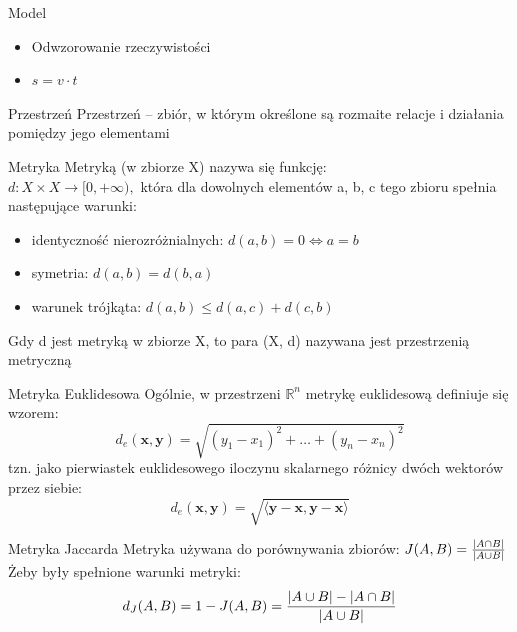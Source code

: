 \documentclass[a4paper]{beamer}
\begin{document}
\begin{frame}
\begin{block}{Model}
\begin{itemize}
\item Odwzorowanie rzeczywistości
\item $s = v \cdot t$
\end{itemize}
\end{block}
\begin{block}{Przestrzeń}
Przestrzeń – zbiór, w którym określone są rozmaite relacje i działania pomiędzy jego elementami
\end{block}
\begin{block}{Metryka}
Metryką (w zbiorze X) nazywa się funkcję: \\
$d: X \times X \to [0, +\infty),$
która dla dowolnych elementów a, b, c tego zbioru spełnia następujące warunki:
\begin{itemize}
\item identyczność nierozróżnialnych: $d(a, b) = 0 \iff a = b$
\item symetria: $d(a, b) = d(b, a)$
\item warunek trójkąta: $d(a, b) \leqslant d(a, c) + d(c, b)$
\end{itemize}
Gdy d jest metryką w zbiorze X, to para (X, d) nazywana jest przestrzenią metryczną
\end{block}
\end{frame}
\begin{frame}
\begin{block}{Metryka Euklidesowa}
Ogólnie, w przestrzeni $\mathbb R^n$ metrykę euklidesową definiuje się wzorem:
$$d_e(\mathbf x, \mathbf y) = \sqrt{(y_1 - x_1)^2 + \dots + (y_n - x_n)^2}$$
tzn. jako pierwiastek euklidesowego iloczynu skalarnego różnicy dwóch wektorów przez siebie:
$$d_e(\mathbf x, \mathbf y) = \sqrt{\langle \mathbf y - \mathbf x, \mathbf y - \mathbf x \rangle}$$
\end{block}
\begin{block}{Metryka Jaccarda}
Metryka używana do porównywania zbiorów:
$J(A,B) = {{|A \cap B|}\over{|A \cup B|}}$ \\
Żeby były spełnione warunki metryki:
$$d_J(A,B) = 1 - J(A,B) = { { |A \cup B| - |A \cap B| } \over |A \cup B| }$$
\end{block}
\end{frame}
\end{document}
